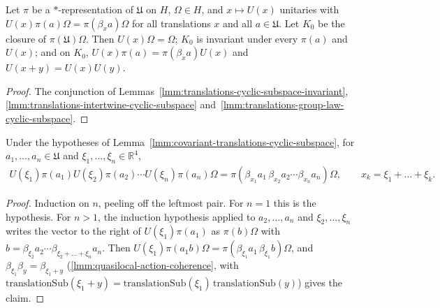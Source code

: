 \begin{lemma}
    \label{lmm:covariant-translations-cyclic-subspace}
    \leanok
    Let $\pi$ be a $*$-representation of $\mathfrak{U}$ on $H$, $\Omega \in H$, and $x \mapsto U(x)$ unitaries with $U(x)\pi(a)\Omega = \pi(\beta_x a)\Omega$ for all translations $x$ and all $a \in \mathfrak{U}$. Let $K_0$ be the closure of $\pi(\mathfrak{U})\Omega$. Then $U(x)\Omega = \Omega$; $K_0$ is invariant under every $\pi(a)$ and $U(x)$; and on $K_0$, $U(x)\pi(a) = \pi(\beta_x a)U(x)$ and $U(x+y) = U(x)U(y)$.
\end{lemma}
\begin{proof}
    \leanok
    The conjunction of Lemmas~\ref{lmm:translations-cyclic-subspace-invariant}, \ref{lmm:translations-intertwine-cyclic-subspace} and~\ref{lmm:translations-group-law-cyclic-subspace}.
\end{proof}

\begin{lemma}
    \label{lmm:reeh-schlieder-translated-products}
    \leanok
    Under the hypotheses of Lemma~\ref{lmm:covariant-translations-cyclic-subspace}, for $a_1, \dots, a_n \in \mathfrak{U}$ and $\xi_1, \dots, \xi_n \in \mathbb{R}^4$,
    \begin{align}
        U(\xi_1)\pi(a_1)U(\xi_2)\pi(a_2) \cdots U(\xi_n)\pi(a_n)\Omega = \pi(\beta_{x_1}a_1 \, \beta_{x_2}a_2 \cdots \beta_{x_n}a_n)\Omega, \qquad x_k = \xi_1 + \dots + \xi_k.
    \end{align}
\end{lemma}
\begin{proof}
    \leanok
    Induction on $n$, peeling off the leftmost pair. For $n = 1$ this is the hypothesis. For $n > 1$, the induction hypothesis applied to $a_2, \dots, a_n$ and $\xi_2, \dots, \xi_n$ writes the vector to the right of $U(\xi_1)\pi(a_1)$ as $\pi(b)\Omega$ with $b = \beta_{\xi_2}a_2 \cdots \beta_{\xi_2 + \dots + \xi_n}a_n$. Then $U(\xi_1)\pi(a_1 b)\Omega = \pi(\beta_{\xi_1}a_1 \, \beta_{\xi_1}b)\Omega$, and $\beta_{\xi_1}\beta_y = \beta_{\xi_1 + y}$ (\ref{lmm:quasilocal-action-coherence}, with $\mathrm{translationSub}(\xi_1 + y) = \mathrm{translationSub}(\xi_1)\,\mathrm{translationSub}(y)$) gives the claim.
\end{proof}

